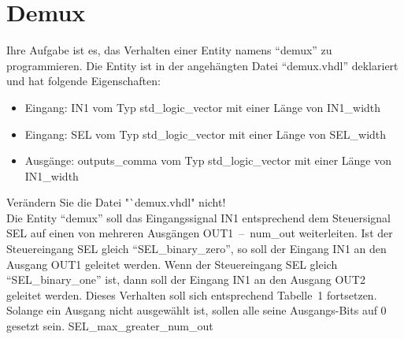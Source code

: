 \documentclass[a4paper,12pt]{article}
\begin{document}
\pagestyle{empty}
\setlength{\parindent}{0em} 
\section*{\noindent Demux }
Ihre Aufgabe ist es, das Verhalten einer Entity  namens "`demux"' zu programmieren. Die Entity ist in der angeh\"angten Datei "`demux.vhdl"' deklariert und hat folgende Eigenschaften:

\begin{itemize}
	\item Eingang: IN1 vom Typ std\_logic\_vector mit einer L\"ange von {{IN1_width}}
	\item Eingang: SEL vom Typ std\_logic\_vector mit einer L\"ange von {{SEL_width}}
	\item Ausg\"ange: {{outputs_comma}} vom Typ std\_logic\_vector mit einer L\"ange von {{IN1_width}}
\end{itemize}

\begin{center}
\end{center}

Ver\"andern Sie die Datei "`demux.vhdl" nicht!\\

Die Entity "`demux"' soll das Eingangssignal IN1 entsprechend dem Steuersignal SEL auf einen von mehreren Ausg\"angen \mbox{OUT1 -- {{num_out}}} weiterleiten. Ist der Steuereingang SEL gleich "`{{SEL_binary_zero}}"', so soll der Eingang IN1 an den Ausgang OUT1 geleitet werden. Wenn der Steuereingang SEL gleich "`{{SEL_binary_one}}"' ist, dann soll der Eingang IN1 an den Ausgang OUT2 geleitet werden. Dieses Verhalten soll sich entsprechend Tabelle~1 fortsetzen. Solange ein Ausgang nicht ausgew\"ahlt ist, sollen alle seine Ausgangs-Bits auf 0 gesetzt sein. {{SEL_max_greater_num_out}}
\end{document}
